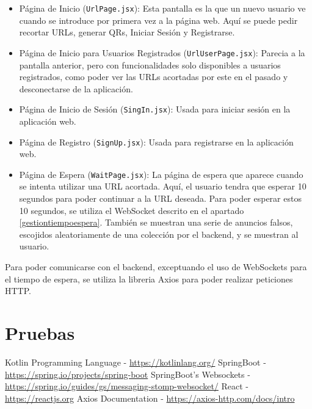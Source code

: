 \documentclass{article}
\begin{document}
\begin{itemize}
	\item Página de Inicio (\texttt{UrlPage.jsx}): Esta pantalla es la que un nuevo usuario ve cuando se introduce por primera vez a la página web. Aquí se puede pedir recortar URLs, 
	generar QRs, Iniciar Sesión y Registrarse.
	\item Página de Inicio para Usuarios Registrados (\texttt{UrlUserPage.jsx}): Parecia a la pantalla anterior, pero con funcionalidades solo disponibles a usuarios registrados, como
	poder ver las URLs acortadas por este en el pasado y desconectarse de la aplicación.
	\item Página de Inicio de Sesión (\texttt{SingIn.jsx}): Usada para iniciar sesión en la aplicación web.
	\item Página de Registro (\texttt{SignUp.jsx}): Usada para registrarse en la aplicación web.
	\item Página de Espera (\texttt{WaitPage.jsx}): La página de espera que aparece cuando se intenta utilizar una URL acortada. Aquí, el usuario tendra que esperar 10 segundos para
	poder continuar a la URL deseada. Para poder esperar estos 10 segundos, se utiliza el WebSocket descrito en el apartado \ref{gestiontiempoespera}. También se muestran una serie de
	anuncios falsos, escojidos aleatoriamente de una colección por el backend, y se muestran al usuario.
\end{itemize}

Para poder comunicarse con el backend, exceptuando el uso de WebSockets para el tiempo de espera, se utiliza la libreria Axios\cite{Axios} para poder realizar peticiones HTTP.

\section{Pruebas}\newpage

\begin{thebibliography}{9}
	Kotlin Programming Language - \url{https://kotlinlang.org/}
	SpringBoot - \url{https://spring.io/projects/spring-boot}
	SpringBoot's Websockets - \url{https://spring.io/guides/gs/messaging-stomp-websocket/}
	React - \url{https://reactjs.org}
	Axios Documentation - \url{https://axios-http.com/docs/intro}
\end{thebibliography}
 
\end{document}
